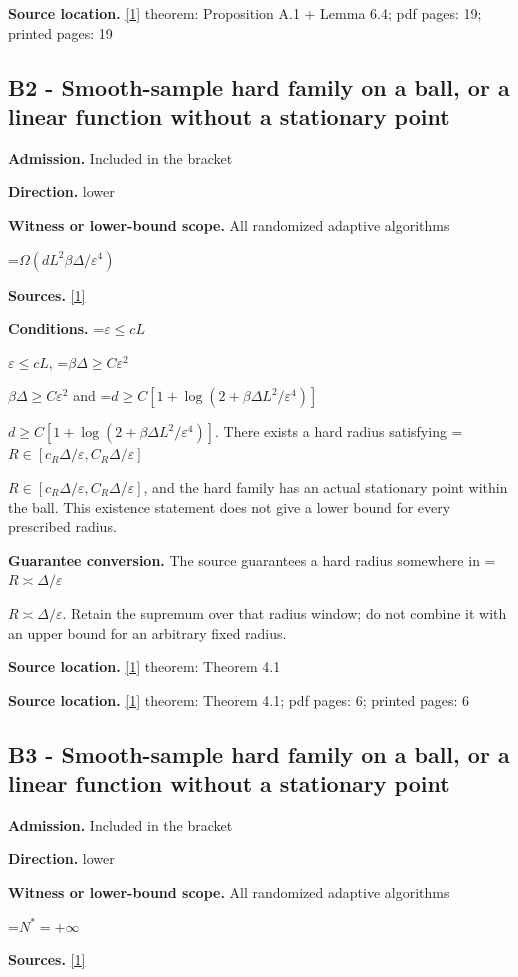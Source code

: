 \documentclass[10pt,a4paper]{article}
\newcommand{\AtlasMath}[1]{\par\begingroup\centering\setbox0=\hbox{$\displaystyle #1$}\ifdim\wd0>1.4\linewidth\typeout{ATLAS WIDE FORMULA: \the\wd0}\fi\ifdim\wd0>\linewidth\resizebox{\linewidth}{!}{\box0}\else\box0\fi\par\endgroup}
\newcommand{\AtlasInlineMath}[1]{\begingroup\setbox0=\hbox{$#1$}\ifdim\wd0>.4\linewidth\endgroup\AtlasMath{#1}\else\endgroup$#1$\fi}
\begin{document}
\textbf{Source location.} \href{https://arxiv.org/html/2610.00275v2}{[1]} theorem: Proposition A.1 + Lemma 6.4; pdf pages: 19; printed pages: 19

\subsection{B2 - Smooth-sample hard family on a ball, or a linear function without a stationary point}
\textbf{Admission.} Included in the bracket

\textbf{Direction.} lower

\textbf{Witness or lower-bound scope.} All randomized adaptive algorithms

\AtlasMath{\Omega(dL^2\beta\Delta/\varepsilon^4)}
\textbf{Sources.} \href{https://arxiv.org/html/2610.00275v2}{[1]}

\textbf{Conditions.} \AtlasInlineMath{\varepsilon\le cL}, \AtlasInlineMath{\beta\Delta\ge C\varepsilon^2} and \AtlasInlineMath{d\ge C[1+\log(2+\beta\Delta L^2/\varepsilon^4)]}. There exists a hard radius satisfying \AtlasInlineMath{R\in[c_R\Delta/\varepsilon,C_R\Delta/\varepsilon]}, and the hard family has an actual stationary point within the ball. This existence statement does not give a lower bound for every prescribed radius.

\textbf{Guarantee conversion.} The source guarantees a hard radius somewhere in \AtlasInlineMath{R\asymp\Delta/\varepsilon}. Retain the supremum over that radius window; do not combine it with an upper bound for an arbitrary fixed radius.

\textbf{Source location.} \href{https://arxiv.org/html/2610.00275v2}{[1]} theorem: Theorem 4.1

\textbf{Source location.} \href{https://arxiv.org/html/2610.00275v2}{[1]} theorem: Theorem 4.1; pdf pages: 6; printed pages: 6

\subsection{B3 - Smooth-sample hard family on a ball, or a linear function without a stationary point}
\textbf{Admission.} Included in the bracket

\textbf{Direction.} lower

\textbf{Witness or lower-bound scope.} All randomized adaptive algorithms

\AtlasMath{N^*=+\infty}
\textbf{Sources.} \href{https://arxiv.org/html/2610.00275v2}{[1]}
\end{document}
